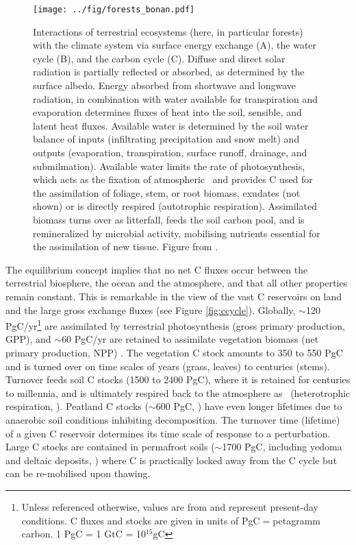 \begin{figure}[ht!]
\begin{center}
  \texttt{[image: ../fig/forests\_bonan.pdf]}
\end{center}
  \caption[Interactions of terrestrial ecosystems with climate]{Interactions of terrestrial ecosystems (here, in particular forests) with the climate system via surface energy exchange (A), the water cycle (B), and the carbon cycle (C). Diffuse and direct solar radiation is partially reflected or absorbed, as determined by the surface albedo. Energy absorbed from shortwave and longwave radiation, in combination with water available for transpiration and evaporation determines fluxes of heat into the soil, sensible, and latent heat fluxes. Available water is determined by the soil water balance of inputs (infiltrating precipitation and snow melt) and outputs (evaporation, transpiration, surface runoff, drainage, and submilmation). Available water limits the rate of photosynthesis, which acts as the fixation of atmospheric \coo\ and provides C used for the assimilation of foliage, stem, or root biomass, exudates (not shown) or is directly respired (autotrophic respiration). Assimilated biomass turns over as litterfall, feeds the soil carbon pool, and is remineralized by microbial activity, mobilising nutrients essential for the assimilation of new tissue. Figure from \citet{bonan08}.}
\label{fig:bonan}
\end{figure}
The equilibrium concept implies that no net C fluxes occur between the terrestrial biosphere, the ocean and the atmosphere, and that all other properties remain constant. This is remarkable in the view of the vast C reservoirs on land and the large gross exchange fluxes (see Figure \ref{fig:ccycle}). Globally, $\sim$120 PgC/yr\footnote{Unless referenced otherwise, values are from \citet{ciais13ipcc} and represent present-day conditions. C fluxes and stocks are given in units of PgC$=$petagramm carbon. 1 PgC = 1 GtC = 10$^{15}$gC} are assimilated by terrestrial photosynthesis (gross primary production, GPP), and $\sim$60 PgC/yr are retained to assimilate vegetation biomass (net primary production, NPP) \citep{gruber04book}. The vegetation C stock amounts to 350 to 550 PgC and is turned over on time scales of years (grass, leaves) to centuries (stems). Turnover feeds soil C stocks (1500 to 2400 PgC), where it is retained for centuries to millennia, and is ultimately respired back to the atmosphere as \coo\ (heterotrophic respiration, \rh ). Peatland C stocks ($\sim$600 PgC, \citet{yu10grl}) have even longer lifetimes due to anaerobic soil conditions inhibiting decomposition. The turnover time (lifetime) of a given C reservoir determines its time scale of response to a perturbation. Large C stocks are contained in permafrost soils ($\sim$1700 PgC, including yedoma and deltaic deposits, \citet{tarnocai09gbc}) where C is practically locked away from the C cycle but can be re-mobilised upon thawing.\\
